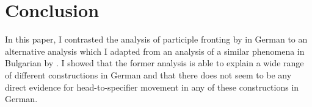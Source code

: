 \documentclass[letterpaper,parskip=half]{scrartcl}
\begin{document}







\section{Conclusion}

In this paper, I contrasted the analysis of participle fronting by \citet{webelhuth1987remnant} in German to an alternative analysis which I adapted from an analysis of a similar phenomena in Bulgarian by \citet{harizanov2015head}. I showed that the former analysis is able to explain a wide range of different constructions in German and that there does not seem to be any direct evidence for head-to-specifier movement in any of these constructions in German. 










% 



%








% 


\small

\nocite{strong1886outlines}



\end{document}
